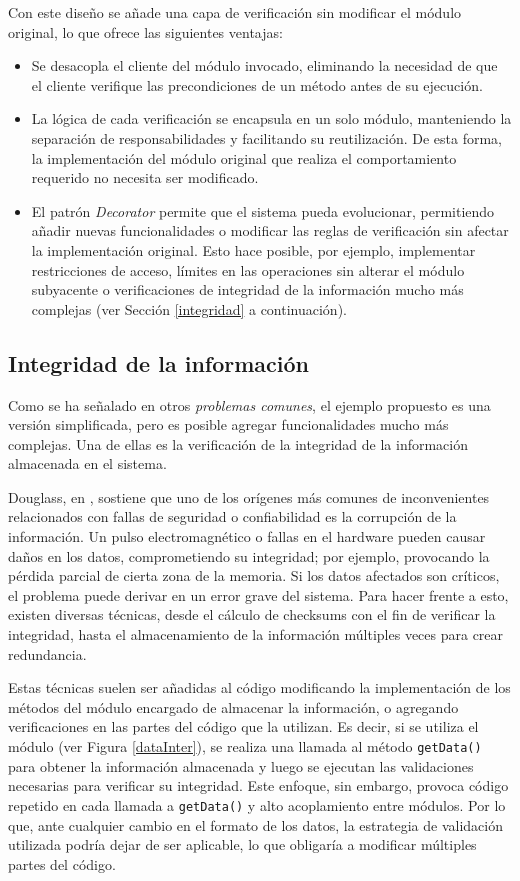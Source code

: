 Con este diseño se añade una capa de verificación sin modificar el módulo original, lo que ofrece las siguientes ventajas:
\begin{itemize}
\item Se desacopla el cliente del módulo invocado, eliminando la necesidad de que el cliente verifique las precondiciones de un método antes de su ejecución.
\item La lógica de cada verificación se encapsula en un solo módulo, manteniendo la separación de responsabilidades y facilitando su reutilización. De esta forma, la implementación del módulo original que realiza el comportamiento requerido no necesita ser modificado.
\item El patrón \textit{Decorator} permite que el sistema pueda evolucionar, permitiendo añadir nuevas funcionalidades o modificar las reglas de verificación sin afectar la implementación original. Esto hace posible, por ejemplo, implementar restricciones de acceso, límites en las operaciones sin alterar el módulo subyacente o verificaciones de integridad de la información mucho más complejas (ver Sección \ref{integridad} a continuación).
\end{itemize}

\subsection*{Integridad de la información}
\label{integridad}

Como se ha señalado en otros \textit{problemas comunes}, el ejemplo propuesto es una versión simplificada, pero es posible agregar funcionalidades mucho más complejas. Una de ellas es la verificación de la integridad de la información almacenada en el sistema.

Douglass, en \cite{douglass}, sostiene que uno de los orígenes más comunes de inconvenientes relacionados con fallas de seguridad o confiabilidad es la corrupción de la información. Un pulso electromagnético o fallas en el hardware pueden causar daños en los datos, comprometiendo su integridad; por ejemplo, provocando la pérdida parcial de cierta zona de la memoria. Si los datos afectados son críticos, el problema puede derivar en un error grave del sistema. Para hacer frente a esto, existen diversas técnicas, desde el cálculo de checksums con el fin de verificar la integridad, hasta el almacenamiento de la información múltiples veces para crear redundancia.

Estas técnicas suelen ser añadidas al código modificando la implementación de los métodos del módulo encargado de almacenar la información, o agregando verificaciones en las partes del código que la utilizan. Es decir, si se utiliza el módulo \Data (ver Figura \ref{dataInter}), se realiza una llamada al método \verb|getData()| para obtener la información almacenada y luego se ejecutan las validaciones necesarias para verificar su integridad. Este enfoque, sin embargo, provoca código repetido en cada llamada a \verb|getData()| y alto acoplamiento entre módulos. Por lo que, ante cualquier cambio en el formato de los datos, la estrategia de validación utilizada podría dejar de ser aplicable, lo que obligaría a modificar múltiples partes del código.


